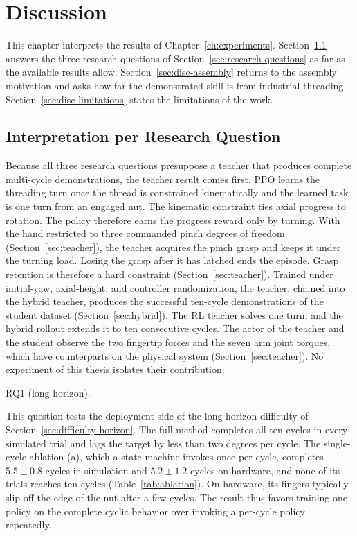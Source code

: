 \chapter{Discussion}\label{ch:discussion}%

This chapter interprets the results of Chapter~\ref{ch:experiments}. Section~\ref{sec:disc-ablations} answers the three research questions of Section~\ref{sec:research-questions} as far as the available results allow. Section~\ref{sec:disc-assembly} returns to the assembly motivation and asks how far the demonstrated skill is from industrial threading. Section~\ref{sec:disc-limitations} states the limitations of the work.

\section{Interpretation per Research Question}\label{sec:disc-ablations}

Because all three research questions presuppose a teacher that produces complete multi-cycle demonstrations, the teacher result comes first. \ac{PPO} learns the threading turn once the thread is constrained kinematically and the learned task is one turn from an engaged nut. The kinematic constraint ties axial progress to rotation. The policy therefore earns the progress reward only by turning. With the hand restricted to three commanded pinch degrees of freedom (Section~\ref{sec:teacher}), the teacher acquires the pinch grasp and keeps it under the turning load. Losing the grasp after it has latched ends the episode. Grasp retention is therefore a hard constraint (Section~\ref{sec:teacher}). Trained under initial-yaw, axial-height, and controller randomization, the teacher, chained into the hybrid teacher, produces the successful ten-cycle demonstrations of the student dataset (Section~\ref{sec:hybrid}). The \ac{RL} teacher solves one turn, and the hybrid rollout extends it to ten consecutive cycles. The actor of the teacher and the student observe the two fingertip forces and the seven arm joint torques, which have counterparts on the physical system (Section~\ref{sec:teacher}). No experiment of this thesis isolates their contribution.

\begin{description}
  \item[RQ1 (long horizon).] \RQone
\end{description}
This question tests the deployment side of the long-horizon difficulty of Section~\ref{sec:difficulty-horizon}. The full method completes all ten cycles in every simulated trial and lags the target by less than two degrees per cycle. The single-cycle ablation (a), which a state machine invokes once per cycle, completes $5.5\pm0.8$ cycles in simulation and $5.2\pm1.2$ cycles on hardware, and none of its trials reaches ten cycles (Table~\ref{tab:ablation}). On hardware, its fingers typically slip off the edge of the nut after a few cycles. The result thus favors training one policy on the complete cyclic behavior over invoking a per-cycle policy repeatedly.

